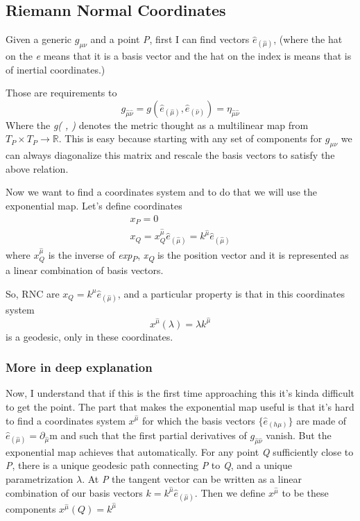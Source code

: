 \subsection{Riemann Normal Coordinates}
Given a generic $g_{\mu \nu }$ and a point \emph{P}, first I can find vectors $\hat{e}_{\left( \hat{\mu } \right)}$, (where the hat on the \emph{e} means that it is a basis vector and the hat on the index is means that is of inertial coordinates.)\par
Those are requirements to 
\[
g_{\hat{\mu }\hat{\nu }} =  g\left( \hat{e}_{\left( \hat{\mu } \right)}, \hat{e}_{\left( \hat{\nu } \right)} \right) = \eta _{\hat{\mu }\hat{\nu }}
\]
Where the \emph{g( , )} denotes the metric thought as a multilinear map from $T_{P} \times T_{P} \to \mathbb{R}$. This is easy because starting with any set of components for $g_{\mu \nu }$ we can always diagonalize this matrix and rescale the basis vectors to satisfy the above relation.\par
Now we want to find a coordinates system and to do that we will use the exponential map.
Let's define coordinates 
\begin{gather*}
x_{P} = 0 \\
x_{Q} = x^{\hat{\mu }}_{Q} \hat{e}_{\left( \hat{\mu } \right)} = k^{\hat{\mu }} \hat{e}_{\left( \hat{\mu } \right)}
\end{gather*}
where $x^{\hat{\mu }}_{Q}$ is the inverse of \emph{exp\textsubscript{P}}, \emph{x\textsubscript{Q}} is the position vector and it is represented as a linear combination of basis vectors.\par
So, RNC are $x_{Q } = k^{\mu } \hat{e}_{\left( \hat{\mu } \right)}$, and a particular property is that in this coordinates system 
\[
x^{\hat{\mu }}\left( \lambda  \right) = \lambda k^{\hat{\mu }}
\]
is a geodesic, only in these coordinates.
\subsubsection{More in deep explanation}
Now, I understand that if this is the first time approaching this it's kinda difficult to get the point. 
The part that makes the exponential map useful is that it's hard to find a coordinates system $x^{\hat{\mu }}$ for which the basis vectors $\{ \hat{e}_{\left( h\mu  \right)}\}$ are made of $\hat{e}_{\left( \hat{\mu } \right)} = \partial_{\hat{\mu } }$m and such that the first partial derivatives of $g_{\hat{\mu }\hat{\nu }}$ vanish. But the exponential map achieves that automatically. For any point \emph{Q} sufficiently close to \emph{P}, there is a unique geodesic path connecting \emph{P} to \emph{Q}, and a unique parametrization $\lambda $. At \emph{P} the tangent vector can be written as a linear combination of our basis vectors $k = k^{\hat{\mu }} \hat{e}_{\left( \hat{\mu } \right)}$. Then we define $x^{\hat{\mu }}$ to be these components $x^{\hat{\mu }}\left( Q \right) = k^{\hat{\mu }}$

